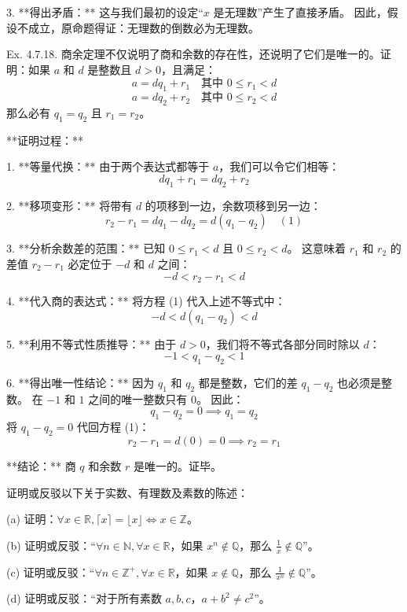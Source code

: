 \begin{questions}
\begin{solution}
3. **得出矛盾：**
   这与我们最初的设定“$x$ 是无理数”产生了直接矛盾。
   因此，假设不成立，原命题得证：无理数的倒数必为无理数。
\end{solution}

\question
Ex. 4.7.18. 商余定理不仅说明了商和余数的存在性，还说明了它们是唯一的。证明：如果 $a$ 和 $d$ 是整数且 $d > 0$，且满足：
\[ a = dq_1 + r_1 \quad \text{其中 } 0 \le r_1 < d \]
\[ a = dq_2 + r_2 \quad \text{其中 } 0 \le r_2 < d \]
那么必有 $q_1 = q_2$ 且 $r_1 = r_2$。

\begin{solution}
**证明过程：**

1. **等量代换：**
   由于两个表达式都等于 $a$，我们可以令它们相等：
   \[ dq_1 + r_1 = dq_2 + r_2 \]

2. **移项变形：**
   将带有 $d$ 的项移到一边，余数项移到另一边：
   \[ r_2 - r_1 = dq_1 - dq_2 = d(q_1 - q_2) \quad (1) \]

3. **分析余数差的范围：**
   已知 $0 \le r_1 < d$ 且 $0 \le r_2 < d$。
   这意味着 $r_1$ 和 $r_2$ 的差值 $r_2 - r_1$ 必定位于 $-d$ 和 $d$ 之间：
   \[ -d < r_2 - r_1 < d \]

4. **代入商的表达式：**
   将方程 (1) 代入上述不等式中：
   \[ -d < d(q_1 - q_2) < d \]

5. **利用不等式性质推导：**
   由于 $d > 0$，我们将不等式各部分同时除以 $d$：
   \[ -1 < q_1 - q_2 < 1 \]

6. **得出唯一性结论：**
   因为 $q_1$ 和 $q_2$ 都是整数，它们的差 $q_1 - q_2$ 也必须是整数。
   在 $-1$ 和 $1$ 之间的唯一整数只有 $0$。
   因此：
   \[ q_1 - q_2 = 0 \implies q_1 = q_2 \]
   将 $q_1 - q_2 = 0$ 代回方程 (1)：
   \[ r_2 - r_1 = d(0) = 0 \implies r_2 = r_1 \]

**结论：** 商 $q$ 和余数 $r$ 是唯一的。证毕。
\end{solution}

\question
证明或反驳以下关于实数、有理数及素数的陈述：

(a) 证明：$\forall x \in \mathbb{R}, \lceil x \rceil = \lfloor x \rfloor \iff x \in \mathbb{Z}$。

(b) 证明或反驳：“$\forall n \in \mathbb{N}, \forall x \in \mathbb{R}$，如果 $x^n \notin \mathbb{Q}$，那么 $\frac{1}{x} \notin \mathbb{Q}$”。

(c) 证明或反驳：“$\forall n \in \mathbb{Z}^+, \forall x \in \mathbb{R}$，如果 $x \notin \mathbb{Q}$，那么 $\frac{1}{x^n} \notin \mathbb{Q}$”。

(d) 证明或反驳：“对于所有素数 $a, b, c$，$a + b^2 \neq c^2$”。


\end{questions}
